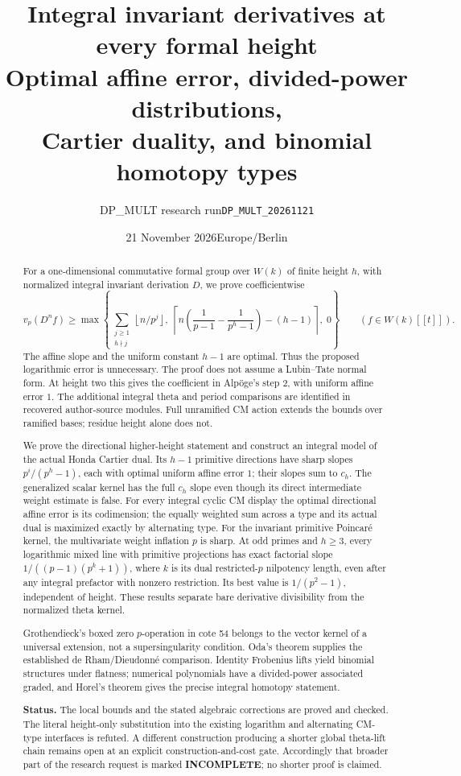 \documentclass[11pt,a4paper]{article}
\title{Integral invariant derivatives at every formal height\\
\large Optimal affine error, divided-power distributions,\\Cartier duality, and binomial homotopy types}
\author{DP\_MULT research run\quad\texttt{DP\_MULT\_20261121}}
\date{21 November 2026\quad Europe/Berlin}
\theoremstyle{definition}\newtheorem{remark}[theorem]{Remark}
\newcommand{\vp}{v_p}\newcommand{\dR}{\mathrm{dR}}\newcommand{\crys}{\mathrm{crys}}
\newcommand{\ceil}[1]{\left\lceil #1\right\rceil}\newcommand{\floor}[1]{\left\lfloor #1\right\rfloor}
\begin{document}
\maketitle
\begin{abstract}
For a one-dimensional commutative formal group over $W(k)$ of finite height $h$, with normalized integral invariant derivation $D$, we prove coefficientwise
\[
 \vp(D^n f)\ge
 \max\left\{\sum_{\substack{j\ge1\\h\nmid j}}\floor{n/p^j},\;
 \ceil{n\left(\frac1{p-1}-\frac1{p^h-1}\right)-(h-1)},\;0\right\}
 \qquad(f\in W(k)[[t]]).
\]
The affine slope and the uniform constant $h-1$ are optimal. Thus the proposed logarithmic error is unnecessary. The proof does not assume a Lubin--Tate normal form. At height two this gives the coefficient in Alp\"oge's step 2, with uniform affine error $1$. The additional integral theta and period comparisons are identified in recovered author-source modules. Full unramified CM action extends the bounds over ramified bases; residue height alone does not.

We prove the directional higher-height statement and construct an integral model of the actual Honda Cartier dual. Its $h-1$ primitive directions have sharp slopes $p^i/(p^h-1)$, each with optimal uniform affine error $1$; their slopes sum to $c_h$. The generalized scalar kernel has the full $c_h$ slope even though its direct intermediate weight estimate is false. For every integral cyclic CM display the optimal directional affine error is its codimension; the equally weighted sum across a type and its actual dual is maximized exactly by alternating type. For the invariant primitive Poincar\'e kernel, the multivariate weight inflation $p$ is sharp. At odd primes and $h\ge3$, every logarithmic mixed line with primitive projections has exact factorial slope $1/((p-1)(p^k+1))$, where $k$ is its dual restricted-$p$ nilpotency length, even after any integral prefactor with nonzero restriction. Its best value is $1/(p^2-1)$, independent of height. These results separate bare derivative divisibility from the normalized theta kernel.

Grothendieck's boxed zero $p$-operation in cote 54 belongs to the vector kernel of a universal extension, not a supersingularity condition. Oda's theorem supplies the established de Rham/Dieudonn\'e comparison. Identity Frobenius lifts yield binomial structures under flatness; numerical polynomials have a divided-power associated graded, and Horel's theorem gives the precise integral homotopy statement.

\textbf{Status.} The local bounds and the stated algebraic corrections are proved and checked. The literal height-only substitution into the existing logarithm and alternating CM-type interfaces is refuted. A different construction producing a shorter global theta-lift chain remains open at an explicit construction-and-cost gate. Accordingly that broader part of the research request is marked \textbf{INCOMPLETE}; no shorter proof is claimed.
\end{abstract}
\tableofcontents
\newpage
\end{document}
